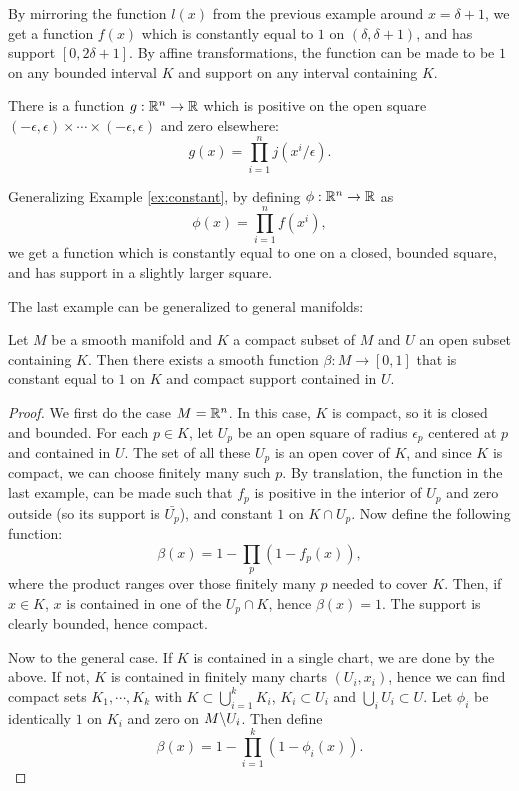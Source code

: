 \documentclass[11pt, english]{article}
\begin{document}
\begin{example}
\label{ex:constant}
  By mirroring the function $l(x)$ from the previous example around $x=\delta+1$, we get a function $f(x)$  which is constantly equal to $1$ on $(\delta,\delta+1)$, and has support $[0,2\delta + 1]$. By affine transformations, the function can be made to be $1$ on any bounded interval $K$ and support on any interval containing $K$.
\end{example}

\begin{example}
There is a function $g:\mathbb{R}^n \to \mathbb{R}$ which is positive on the open square $(-\epsilon, \epsilon) \times \dotsb \times (-\epsilon, \epsilon)$ and zero elsewhere:
\[
g(x) = \prod_{i=1}^n j(x^i/\epsilon).
\]
\end{example}

\begin{example}
Generalizing Example \ref{ex:constant}, by defining $\phi:\mathbb{R}^n \to \mathbb{R}$ as
\[
\phi(x) = \prod_{i=1}^n f(x^i),
\]
we get a function which is constantly equal to one on a closed, bounded square, and has support in a slightly larger square.
\end{example}

The last example can be generalized to general manifolds:
\begin{prop}
\label{prop:suppfunc}
Let $M$ be a smooth manifold and $K$ a compact subset of $M$ and $U$ an open subset containing $K$. Then there exists a smooth function $\beta\colon M \to [0,1]$ that is constant equal to $1$ on $K$ and compact support contained in $U$.
\end{prop}
\begin{proof}
We first do the case $M=\mathbb{R}^n$. In this case, $K$ is compact, so it is closed and bounded. For each $p \in K$, let $U_p$ be an open square of radius $\epsilon_p$ centered at $p$ and contained in $U$. The set of all these $U_p$ is an open cover of $K$, and since $K$ is compact, we can choose finitely many such $p$. By translation, the function in the last example, can be made such that $f_p$ is positive in the interior of $U_p$ and zero outside (so its support is $\bar{U_p}$), and constant $1$ on $K \cap U_p$. Now define the following function:
\[
\beta(x) = 1 - \prod_p \left(1-f_p(x)\right),
\]
where the product ranges over those finitely many $p$ needed to cover $K$. Then, if $x \in K$, $x$ is contained in one of the $U_p \cap K$, hence $\beta(x)=1$. The support is clearly bounded, hence compact.

Now to the general case. If $K$ is contained in a single chart, we are done by the above. If not, $K$ is contained in finitely many charts $(U_i,x_i)$, hence we can find compact sets $K_1,\cdots, K_k$ with $K \subset \bigcup_{i=1}^k K_i$, $K_i \subset U_i$ and $\bigcup_i U_i \subset U$. Let $\phi_i$ be identically $1$ on $K_i$ and zero on $M \backslash U_i$. Then define
\[
\beta(x) = 1 - \prod_{i=1}^k (1-\phi_i(x)).
\]
\end{proof}
\end{document}
